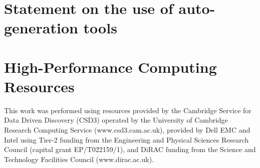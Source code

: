 \documentclass[12pt]{article}
\begin{document}



\appendix

\section{Statement on the use of auto-generation tools}

\section {High-Performance Computing Resources}

This work was performed using resources provided by the Cambridge Service for Data Driven Discovery (CSD3) operated by the University of Cambridge Research Computing Service (www.csd3.cam.ac.uk),
provided by Dell EMC and Intel using Tier-2 funding from the Engineering and Physical Sciences Research Council (capital grant EP/T022159/1),
and DiRAC funding from the Science and Technology Facilities Council (www.dirac.ac.uk).
\end{document}
